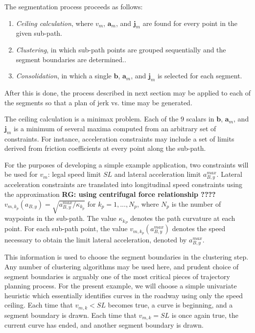 \documentclass[letterpaper, 10 pt, conference]{ieeeconf}  %
\begin{document}
The segmentation process proceeds as follows:
\begin{enumerate} \label{asdf}
  \item \emph{Ceiling calculation}, where $v_m$, $\mathbf{a}_m$, and $\mathbf{j}_m$ 
are found for every point in the given sub-path.
  \item \emph{Clustering}, in which sub-path points are grouped sequentially and the segment boundaries are determined..
  \item \emph{Consolidation}, in which a single $\mathbf{b}$, $\mathbf{a}_m$, and $\mathbf{j}_m$ is selected for each segment.
\end{enumerate}
After this is done, the process described in next section may be applied to each of the segments so that a plan of jerk vs. time may be generated.

The ceiling calculation is a minimax problem.
Each of the 9 scalars in $\mathbf{b}$, $\mathbf{a}_m$, and $\mathbf{j}_m$ is a minimum of several maxima computed from an arbitrary set of constraints.
For instance, acceleration constraints may include a set of limits derived from friction coefficients at every point along the sub-path.

For the purposes of developing a simple example application, two constraints will be used for $v_{m}$: legal speed limit $SL$ and lateral acceleration limit $a_{B,y}^{max}$. 
Lateral acceleration constraints are translated into longitudinal speed constraints using the approximation \textbf{ RG: using centrifugal  force relationship ????} $v_{m,k_p}(a_{B,y}) = \sqrt{a_{B,y}^{max}/\kappa_{k_p}}$ for $k_p = 1, ..., N_p$, where $N_p$ is the number of waypoints in the sub-path.
The value $\kappa_{k_P}$ denotes the path curvature at each point.
For each sub-path point, the value $v_{m,k_p}(a_{B,y}^{max})$ denotes the speed necessary to obtain the limit lateral acceleration, denoted by $a^{max}_{B,y}$.

This information is used to choose the segment boundaries in the clustering step.
Any number of clustering algorithms may be used here, and prudent choice of segment boundaries is arguably one of the most critical pieces of trajectory planning process.
For the present example, we will choose a simple univariate heuristic which essentially identifies curves in the roadway using only the speed ceiling.
Each time that $v_{m,k} < SL$ becomes true, a curve is beginning, and a segment boundary is drawn.
Each time that $v_{m,k} = SL$ is once again true, the current curve has ended, and another segment boundary is drawn.
\end{document}
